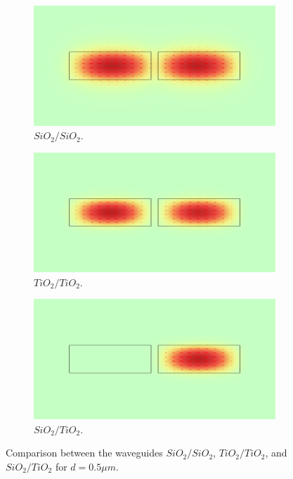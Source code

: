 \documentclass[a4paper,12pt]{article}
\begin{document}
\begin{figure}[H]
    \centering
    \begin{subfigure}{0.45\textwidth}
        \centering
        \includegraphics[scale=0.32]{SiO2_SiO2_normE_0_d0.5um.png}
        \caption{$SiO_2/SiO_2$.}
    \end{subfigure}
    \hfill
    \begin{subfigure}{0.45\textwidth}
        \centering
        \includegraphics[scale=0.32]{TiO2_TiO2_normE_0_d0.5um.png}
        \caption{$TiO_2/TiO_2$.}
    \end{subfigure}
    \hfill
    \begin{subfigure}{0.45\textwidth}
        \centering
        \includegraphics[scale=0.32]{SiO2_TiO2_normE_0_d0.5um.png}
        \caption{$SiO_2/TiO_2$.}
    \end{subfigure}
    \caption{Comparison between the waveguides $SiO_2/SiO_2$, $TiO_2/TiO_2$, and $SiO_2/TiO_2$ for $d = 0.5\mu m$.}
    \label{fig:different_mat_cores}
\end{figure}
\end{document}
